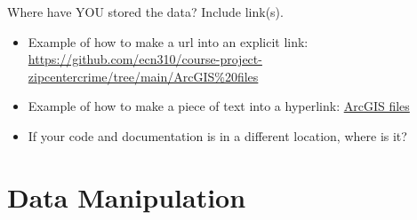 \documentclass[12pt]{article}
\begin{document}
\noindent Where have YOU stored the data? Include link(s).
\begin{itemize}
    \item Example of how to make a url into an explicit link: \url{https://github.com/ecn310/course-project-zipcentercrime/tree/main/ArcGIS%20files}
    \item Example of how to make a piece of text into a hyperlink: \href{https://github.com/ecn310/course-project-zipcentercrime/tree/main/ArcGIS%20files}{ArcGIS files}
    \item If your code and documentation is in a different location, where is it?
\end{itemize}


\section{Data Manipulation}
\label{sec:data}
\end{document}
